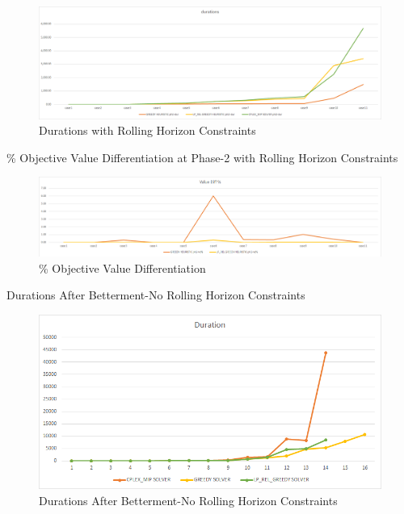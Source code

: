 \documentclass[11pt]{article}
\begin{document}
{\begin{landscape}
        \begin{figure}[htp]
            \centering
            \includegraphics[width=20cm]{durations_with_rh}
            \caption{Durations with Rolling Horizon Constraints}
            \label{fig:fig_durations_with_rh}
        \end{figure}
        
        \begin{table}[htb]
                \centering
                \caption[Short Caption for LoT]{\% Objective Value Differentiation at Phase-2 with Rolling Horizon Constraints}\label{table:tbl_test_obj_diff_with_rh_ph2}
        \end{table}
        \begin{figure}[htp]
            \centering
            \includegraphics[width=20cm]{value_diff_with_rh}
            \caption{\% Objective Value Differentiation}
            \label{fig:fig_value_diff_with_rh}
        \end{figure}
\newpage
        \begin{table}[htb]
                \centering
                \caption[Short Caption for LoT]{Durations After Betterment-No Rolling Horizon Constraints}\label{table:tbl_test_durations_bett_no_rh}
        \end{table}
        \begin{figure}[htp]
            \centering
            \includegraphics[width=12cm]{durations_bett_no_rh}
            \caption{Durations After Betterment-No Rolling Horizon Constraints}
            \label{fig:fig_durations_bett_no_rh}
        \end{figure}


\end{landscape}}
\end{document}
